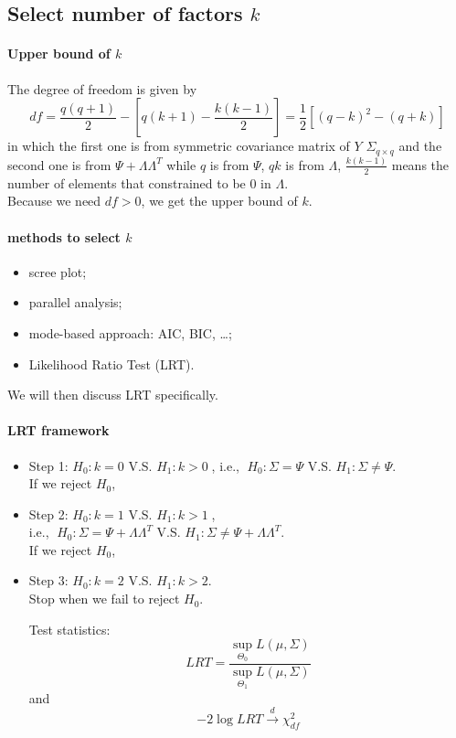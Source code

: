 \documentclass[12pt]{book}
\theoremstyle{definition}
\theoremstyle{remark}
\begin{document}
\subsection{Select number of factors $k$}
\paragraph{Upper bound of $k$}
The degree of freedom is given by
\[df = \frac{q(q+1)}{2} - [q(k+1) - \frac{k(k-1)}{2}] = \frac{1}{2}[(q-k)^2 - (q+k)]\]
in which the first one is from symmetric covariance matrix of $Y$ $\Sigma_{q\times q}$ and the second one is from $\Psi + \Lambda\Lambda^T$ while $q$ is from $\Psi$, $qk$ is from $\Lambda$, $\frac{k(k-1)}{2}$ means the number of elements that constrained to be 0 in $\Lambda$.\\
Because we need $df > 0$, we get the upper bound of $k$. 

\paragraph{methods to select $k$}
\begin{itemize}
    \item scree plot;
    \item parallel analysis;
    \item mode-based approach: AIC, BIC, \dots;
    \item Likelihood Ratio Test (LRT).
\end{itemize}
We will then discuss LRT specifically.

\paragraph{LRT framework}
\begin{itemize}
    \item Step 1: $H_0: k = 0$ V.S. $H_1: k>0\; $, i.e., $\;H_0: \Sigma = \Psi$ V.S. $H_1: \Sigma \ne \Psi$.\\

    If we reject $H_0$, 
    \item Step 2: $H_0: k = 1$ V.S. $H_1: k>1\;$, \\i.e., $\;H_0: \Sigma = \Psi+\Lambda\Lambda^T $ V.S. $ H_1: \Sigma \ne \Psi+\Lambda\Lambda^T$.\\

    If we reject $H_0$, 
    \item Step 3: $H_0: k = 2$ V.S. $H_1: k>2$.\\

    Stop when we fail to reject $H_0$.

    Test statistics: 
    \[LRT = \frac{\underset{\Theta_0}{\sup}L(\mu, \Sigma)}{\underset{\Theta_1}{\sup}L(\mu, \Sigma)}\]
    and \[-2\log LRT \overset{d}{\rightarrow} \chi^2_{df}\]
\end{itemize}
\end{document}
